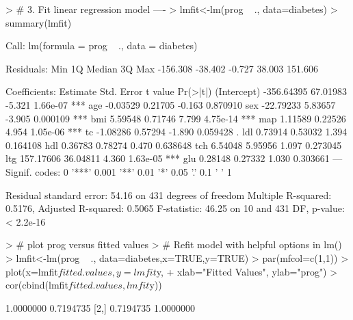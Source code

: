 \documentclass{article}
\begin{document}
\begin{Schunk}
\begin{Sinput}
> # 3.  Fit linear regression model ----
> lmfit<-lm(prog ~ ., data=diabetes)
> summary(lmfit)
\end{Sinput}
\begin{Soutput}
Call:
lm(formula = prog ~ ., data = diabetes)

Residuals:
     Min       1Q   Median       3Q      Max 
-156.308  -38.402   -0.727   38.003  151.606 

Coefficients:
              Estimate Std. Error t value Pr(>|t|)    
(Intercept) -356.64395   67.01983  -5.321 1.66e-07 ***
age           -0.03529    0.21705  -0.163 0.870910    
sex          -22.79233    5.83657  -3.905 0.000109 ***
bmi            5.59548    0.71746   7.799 4.75e-14 ***
map            1.11589    0.22526   4.954 1.05e-06 ***
tc            -1.08286    0.57294  -1.890 0.059428 .  
ldl            0.73914    0.53032   1.394 0.164108    
hdl            0.36783    0.78274   0.470 0.638648    
tch            6.54048    5.95956   1.097 0.273045    
ltg          157.17606   36.04811   4.360 1.63e-05 ***
glu            0.28148    0.27332   1.030 0.303661    
---
Signif. codes:  0 '***' 0.001 '**' 0.01 '*' 0.05 '.' 0.1 ' ' 1

Residual standard error: 54.16 on 431 degrees of freedom
Multiple R-squared:  0.5176,	Adjusted R-squared:  0.5065 
F-statistic: 46.25 on 10 and 431 DF,  p-value: < 2.2e-16
\end{Soutput}
\end{Schunk}
\begin{Schunk}
\begin{Sinput}
> # plot prog versus fitted values
> # Refit model with helpful options in lm()
> lmfit<-lm(prog ~ ., data=diabetes,x=TRUE,y=TRUE)
> par(mfcol=c(1,1))
> plot(x=lmfit$fitted.values,y=lmfit$y,
+      xlab="Fitted Values", ylab="prog")
> cor(cbind(lmfit$fitted.values, lmfit$y))
\end{Sinput}
\begin{Soutput}
          [,1]      [,2]
[1,] 1.0000000 0.7194735
[2,] 0.7194735 1.0000000
\end{Soutput}
\end{Schunk}
\end{document}

